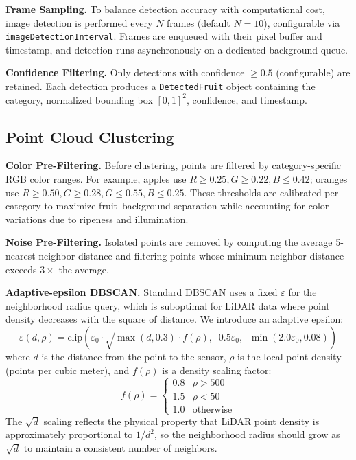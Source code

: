 \documentclass[article,final]{iclr2024_conference}
\begin{document}
\textbf{Frame Sampling.}
To balance detection accuracy with computational cost, image detection is performed every $N$ frames (default $N=10$), configurable via \texttt{imageDetectionInterval}. Frames are enqueued with their pixel buffer and timestamp, and detection runs asynchronously on a dedicated background queue.

\textbf{Confidence Filtering.}
Only detections with confidence $\geq 0.5$ (configurable) are retained. Each detection produces a \texttt{DetectedFruit} object containing the category, normalized bounding box $[0,1]^2$, confidence, and timestamp.

\subsection{Point Cloud Clustering}
\label{sec:clustering}

\textbf{Color Pre-Filtering.}
Before clustering, points are filtered by category-specific RGB color ranges. For example, apples use $R \geq 0.25, G \geq 0.22, B \leq 0.42$; oranges use $R \geq 0.50, G \geq 0.28, G \leq 0.55, B \leq 0.25$. These thresholds are calibrated per category to maximize fruit--background separation while accounting for color variations due to ripeness and illumination.

\textbf{Noise Pre-Filtering.}
Isolated points are removed by computing the average 5-nearest-neighbor distance and filtering points whose minimum neighbor distance exceeds $3\times$ the average.

\textbf{Adaptive-epsilon DBSCAN.}
Standard DBSCAN uses a fixed $\varepsilon$ for the neighborhood radius query, which is suboptimal for LiDAR data where point density decreases with the square of distance. We introduce an adaptive epsilon:
\begin{equation}
\varepsilon(d, \rho) = \text{clip}\!\left(\varepsilon_0 \cdot \sqrt{\max(d, 0.3)} \cdot f(\rho),\;\; 0.5\varepsilon_0,\;\; \min(2.0\varepsilon_0, 0.08)\right)
\label{eq:adaptive-eps}
\end{equation}
where $d$ is the distance from the point to the sensor, $\rho$ is the local point density (points per cubic meter), and $f(\rho)$ is a density scaling factor:
\begin{equation}
f(\rho) = \begin{cases} 0.8 & \rho > 500 \\ 1.5 & \rho < 50 \\ 1.0 & \text{otherwise} \end{cases}
\end{equation}
The $\sqrt{d}$ scaling reflects the physical property that LiDAR point density is approximately proportional to $1/d^2$, so the neighborhood radius should grow as $\sqrt{d}$ to maintain a consistent number of neighbors.
\end{document}
